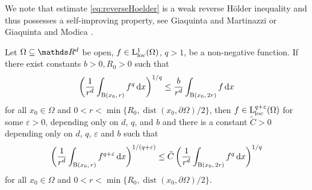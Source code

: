   We note that estimate \eqref{eq:reverseHoelder} is a weak reverse H\"older inequality and thus possesses a self-improving property, see Giaquinta and Martinazzi \cite[Thm.\@~6.38]{giaquintaMartinazzi} or Giaquinta and Modica \cite[Prop.\@~5.1]{giaquintaModica}.

  \begin{prop}
    \label{prop:giaquinta}
    Let $\Omega \subseteq \R^d$ be open, $f \in \mathrm{L}^1_{\mathrm{loc}}(\Omega)$, $q > 1$, be a non-negative function.
    If there exist constants $b > 0, R_0 > 0$ such that
    \begin{align*}
      \bigg( \frac{1}{r^d} \int_{\mathrm{B}(x_0,\, r)} f^q \, {\operatorname{d}\!{x}} \bigg)^{1/q} \leq \frac{b}{r^d} \int_{\mathrm{B}(x_0,\, 2r)} f \, {\operatorname{d}\!{x}}
    \end{align*}
    for all $x_0 \in \Omega$ and $0 < r < \min\big\{ R_0, \operatorname{dist}(x_0, \partial\Omega)/2\big\}$, then $f \in \mathrm{L}^{q + \varepsilon}_{\mathrm{loc}}(\Omega)$ for some $\varepsilon > 0$, depending only on $d$, $q$, and $b$ and there is a constant $\tilde C > 0$ depending only on $d$, $q$, $\varepsilon$ and $b$ such that
    \begin{align*}
      \bigg( \frac{1}{r^d} \int_{\mathrm{B}(x_0,\, r)} f^{q + \varepsilon} \, {\operatorname{d}\!{x}} \bigg)^{1/(q + \varepsilon)} \leq \tilde C \,\bigg( \frac{1}{r^d} \int_{\mathrm{B}(x_0,\, 2r)} f^q \, {\operatorname{d}\!{x}} \bigg)^{1/q}
    \end{align*}
    for all $x_0 \in \Omega$ and $0 < r < \min\{R_0, \operatorname{dist}(x_0, \partial\Omega)/2\}$.
  \end{prop}

